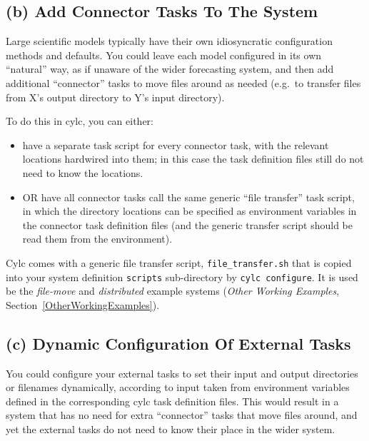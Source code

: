 \documentclass[11pt,a4paper]{article}
\begin{document}
\subsection{(b) Add Connector Tasks To The System} 

Large scientific models typically have their own idiosyncratic
configuration methods and defaults. You could leave each model
configured in its own ``natural'' way, as if unaware of the wider
forecasting system, and then add additional ``connector'' tasks to move
files around as needed (e.g.\ to transfer files from X's output
directory to Y's input directory).

To do this in cylc, you can either:

\begin{itemize}
    \item have a separate task script for every connector task, with the
        relevant locations hardwired into them; in this case the task
        definition files still do not need to know the locations.
    \item OR have all connector tasks call the same generic ``file
        transfer'' task script, in which the directory locations can be
        specified as environment variables in the connector task
        definition files (and the generic transfer script should be read
        them from the environment).
\end{itemize}

Cylc comes with a generic file transfer script, \lstinline=file_transfer.sh= that
is copied into your system definition \lstinline=scripts= sub-directory 
by \lstinline=cylc configure=. It is used be the {\em file-move} and {\em distributed}
example systems ({\em Other Working Examples}, Section~\ref{OtherWorkingExamples}).

\subsection{(c) Dynamic Configuration Of External Tasks}

You could configure your external tasks to set their input and output
directories or filenames dynamically, according to input taken from
environment variables defined in the corresponding cylc task definition
files. This would result in a system that has no need for extra
``connector'' tasks that move files around, and yet the external tasks
do not need to know their place in the wider system.
\end{document}
